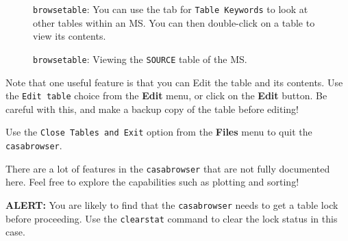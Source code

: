 \begin{figure}[h!]
\begin{center}
\caption{\label{fig:qcasabrowser2} {\tt browsetable}: You can use the
  tab for {\tt Table Keywords} to look at other tables within an MS.
  You can then double-click on a table to view its contents.} 
\hrulefill
\end{center}
\end{figure}
 
\begin{figure}[h!]
\begin{center}
\caption{\label{fig:qcasabrowser3} {\tt browsetable}: Viewing the 
{\tt SOURCE} table of the MS.}
\hrulefill
\end{center}
\end{figure}

Note that one useful feature is that you can Edit the table and its
contents.  Use the {\tt Edit table} choice from the {\bf Edit} menu,
or click on the {\bf Edit} button.  Be careful with this, and make
a backup copy of the table before editing!

Use the {\tt Close Tables and Exit} option from the {\bf Files} menu
to quit the {\tt casabrowser}.

There are a lot of features in the {\tt casabrowser}
that are not fully documented here.  Feel free to explore the
capabilities such as plotting and sorting!

{\bf ALERT:} You are likely to find that the {\tt casabrowser}
needs to get a table lock before proceeding.  Use the {\tt clearstat}
command to clear the lock status in this case.





%

